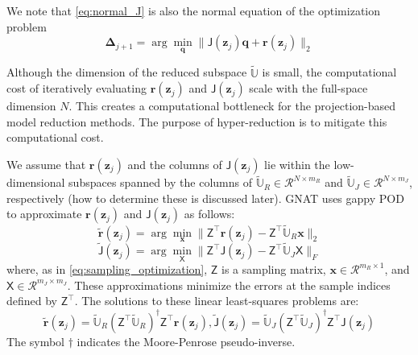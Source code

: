 \documentclass[11pt]{article}
\renewcommand{\vec}[1]{\mathbf{#1}}
\newcommand{\mat}[1]{\mathsf{#1}}
\begin{document}
        We note that \cref{eq:normal_J} is also the normal equation of the  optimization problem
        \begin{equation}
            \boldsymbol{\Delta}_{j+1} = \arg\min_{\vec{q}}\| \mat{J}(\vec{z}_j)\vec{q} + \vec{r}(\vec{z}_j)  \|_2
            \label{eq:normal_optimization}
        \end{equation}


        Although the dimension of the reduced subspace $\widetilde{\mathbb{U}}$ is small, the computational cost of iteratively evaluating $\vec{r}(\vec{z}_j)$ and $\mat{J}(\vec{z}_j)$ scale with the full-space dimension $N$.
        This creates a computational bottleneck for the projection-based model reduction methods.
        The purpose of hyper-reduction is to mitigate this computational cost.

        We assume that $ \vec{r}(\vec{z}_j)$ and the columns of ${\mat{J}}(\vec{z}_j)$ lie within the low-dimensional subspaces spanned by the columns of $ \widetilde{\mathbb{U}}_R \in \mathcal{R}^{N \times m_{R}} $ and $\widetilde{\mathbb{U}}_J \in \mathcal{R}^{N \times m_{J}}$, respectively (how to determine these is discussed later).
        GNAT uses gappy POD to approximate $ \vec{r}(\vec{z}_j)$ and ${\mat{J}}(\vec{z}_j)$ as follows:
        \begin{equation}
        \widetilde{\vec{r}}(\vec{z}_j) = \arg\min_{\vec{x}} \| \mat{Z}^\top \vec{r}(\vec{z}_j) - \mat{Z}^\top \widetilde{\mathbb{U}}_R \vec{x} \|_2
        \end{equation}
        \begin{equation}
        \widetilde{\mat{J}}(\vec{z}_j) = \arg\min_{\mat{X}} \| \mat{Z}^\top {\mat{J}}(\vec{z}_j) - \mat{Z}^\top \widetilde{\mathbb{U}}_J \mat{X} \|_F
        \end{equation}
        where, as in \cref{eq:sampling_optimization}, $\mat{Z}$ is a sampling matrix, $\vec{x} \in \mathcal{R}^{m_{R} \times 1}$, and $\mat{X} \in \mathcal{R}^{m_{J} \times m_{J}}$.
        These approximations minimize the errors at the sample indices defined by $\mat{Z}^\top$.
        The solutions to these linear least-squares problems are:
        \begin{subequations}
            \begin{equation}
            \widetilde{\vec{r}}(\vec{z}_j) = \widetilde{\mathbb{U}}_R \left(\mat{Z}^\top \widetilde{\mathbb{U}}_R\right)^\dagger \mat{Z}^\top{\vec{r}}(\vec{z}_j),
            \end{equation}
            \begin{equation}
            \widetilde{\mat{J}}(\vec{z}_j) = \widetilde{\mathbb{U}}_J \left(\mat{Z}^\top \widetilde{\mathbb{U}}_J\right)^\dagger \mat{Z}^\top{\mat{J}}(\vec{z}_j)
            \end{equation}
            \label{eq:gnat_interp}
        \end{subequations}
        The symbol $\dagger$ indicates the Moore-Penrose pseudo-inverse.
\end{document}

